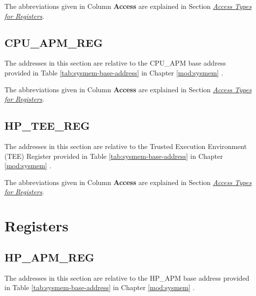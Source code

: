\documentclass[main\_\_EN.tex]{subfiles}
\begin{document}
The abbreviations given in Column \textbf{Access} are explained in Section \hyperref[glossary-access-types]{\textit{Access Types for Registers}}.



\subsection{CPU\_APM\_REG}
\label{sec:permctrl-reg-cpu}

The addresses in this section are relative to the CPU\_APM base address provided in Table \ref{tab:sysmem-base-address} in Chapter \ref{mod:sysmem} \textit{}.

The abbreviations given in Column \textbf{Access} are explained in Section \hyperref[glossary-access-types]{\textit{Access Types for Registers}}.



\subsection{HP\_TEE\_REG}

The addresses in this section are relative to the Trusted Execution Environment (TEE) Register provided in Table \ref{tab:sysmem-base-address} in Chapter \ref{mod:sysmem} \textit{}.

The abbreviations given in Column \textbf{Access} are explained in Section \hyperref[glossary-access-types]{\textit{Access Types for Registers}}.





\newpage
\section{Registers}

\subsection{HP\_APM\_REG}

The addresses in this section are relative to the HP\_APM base address provided in Table \ref{tab:sysmem-base-address} in Chapter \ref{mod:sysmem} \textit{}.
\end{document}
